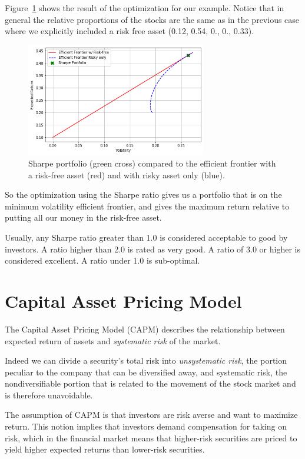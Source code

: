 Figure~\ref{fig:sharpe_ratio} shows the result of the optimization for our example.    
Notice that in general the relative proportions of the stocks are the
same as in the previous case where we explicitly included a risk free
asset (0.12, 0.54, 0., 0., 0.33).

\begin{figure}[htb]
	\centering
	\includegraphics[width=0.7\textwidth]{figures/sharpe_ratio.png}
	\caption{Sharpe portfolio (green cross) compared to the efficient frontier with a risk-free asset (red) and with risky asset only (blue).}
	\label{fig:sharpe_ratio}
\end{figure}

So the optimization using the Sharpe ratio gives us a portfolio that is
on the minimum volatility efficient frontier, and gives the maximum
return relative to putting all our money in the risk-free asset.

Usually, any Sharpe ratio greater than 1.0 is considered acceptable to good by investors. A ratio higher than 2.0 is rated as very good. A ratio of 3.0 or higher is considered excellent. A ratio under 1.0 is sub-optimal.

\section{Capital Asset Pricing Model}
The Capital Asset Pricing Model (CAPM) describes the relationship between expected return of assets and \emph{systematic risk} of the market.

Indeed we can divide a security’s total risk into \emph{unsystematic risk}, the portion peculiar to the company that can be diversified away, and systematic risk, the nondiversifiable portion that is related to the movement of the stock market and is therefore unavoidable. 

The assumption of CAPM is that investors are risk averse and want to maximize return. This notion implies that investors demand compensation for taking on risk, which in the financial market means that higher-risk securities are priced to yield higher expected returns than lower-risk securities. 

